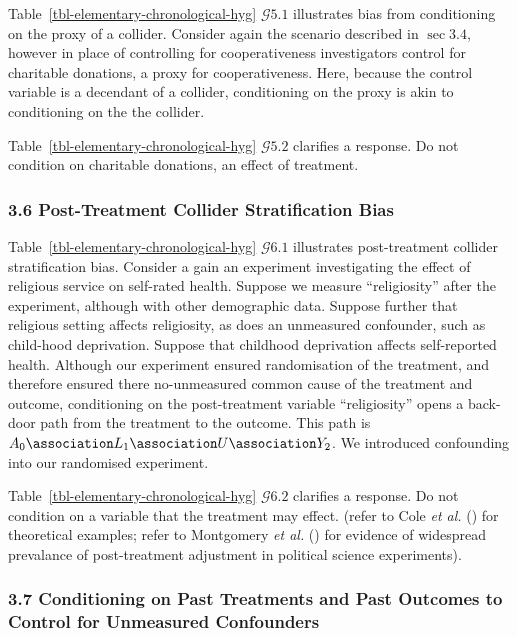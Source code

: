 \documentclass[
  single column]{article}
\begin{document}
Table~\ref{tbl-elementary-chronological-hyg} \(\mathcal{G} 5.1\)
illustrates bias from conditioning on the proxy of a collider. Consider
again the scenario described in \(\sec 3.4\), however in place of
controlling for cooperativeness investigators control for charitable
donations, a proxy for cooperativeness. Here, because the control
variable is a decendant of a collider, conditioning on the proxy is akin
to conditioning on the the collider.

Table~\ref{tbl-elementary-chronological-hyg} \(\mathcal{G} 5.2\)
clarifies a response. Do not condition on charitable donations, an
effect of treatment.

\subsubsection{3.6 Post-Treatment Collider Stratification
Bias}\label{post-treatment-collider-stratification-bias}

Table~\ref{tbl-elementary-chronological-hyg} \(\mathcal{G} 6.1\)
illustrates post-treatment collider stratification bias. Consider a gain
an experiment investigating the effect of religious service on
self-rated health. Suppose we measure ``religiosity'' after the
experiment, although with other demographic data. Suppose further that
religious setting affects religiosity, as does an unmeasured confounder,
such as child-hood deprivation. Suppose that childhood deprivation
affects self-reported health. Although our experiment ensured
randomisation of the treatment, and therefore ensured there
no-unmeasured common cause of the treatment and outcome, conditioning on
the post-treatment variable ``religiosity'' opens a back-door path from
the treatment to the outcome. This path is
\(A_0 \association L_1 \association U \association Y_2\). We introduced
confounding into our randomised experiment.

Table~\ref{tbl-elementary-chronological-hyg} \(\mathcal{G} 6.2\)
clarifies a response. Do not condition on a variable that the treatment
may effect. (refer to Cole \emph{et al.} ()
for theoretical examples; refer to Montgomery \emph{et al.}
() for evidence of widespread
prevalance of post-treatment adjustment in political science
experiments).

\subsubsection{3.7 Conditioning on Past Treatments and Past Outcomes to
Control for Unmeasured
Confounders}\label{conditioning-on-past-treatments-and-past-outcomes-to-control-for-unmeasured-confounders}
\end{document}
